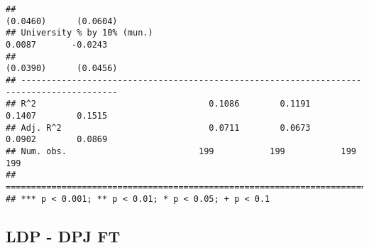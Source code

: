 \documentclass[
]{article}
\begin{document}
\begin{verbatim}
##                                                                 (0.0460)      (0.0604)   
## University % by 10% (mun.)                                       0.0087       -0.0243    
##                                                                 (0.0390)      (0.0456)   
## -----------------------------------------------------------------------------------------
## R^2                                  0.1086        0.1191        0.1407        0.1515    
## Adj. R^2                             0.0711        0.0673        0.0902        0.0869    
## Num. obs.                          199           199           199           199         
## =========================================================================================
## *** p < 0.001; ** p < 0.01; * p < 0.05; + p < 0.1
\end{verbatim}

\hypertarget{ldp---dpj-ft-1}{%
\subsection{LDP - DPJ FT}\label{ldp---dpj-ft-1}}
\end{document}

